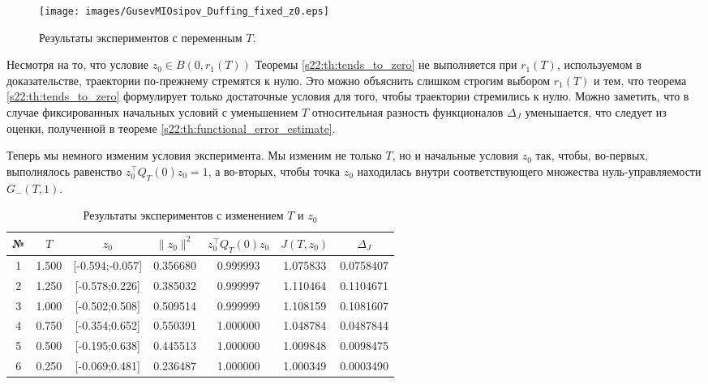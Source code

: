 \documentclass[../main.tex]{subfiles}
\begin{document}
\begin{figure}
 \centering
 \texttt{[image: images/GusevMIOsipov\_Duffing\_fixed\_z0.eps]}
 \caption{Результаты экспериментов с переменным $T$.}
 \label{s22:fig:series1}
\end{figure}

Несмотря на то, что условие $z_0 \in B(0,r_1(T))$ Теоремы \ref{s22:th:tends_to_zero} не выполняется при $r_1(T)$, используемом в доказательстве, траектории по-прежнему стремятся к нулю. 
Это можно объяснить слишком строгим выбором $r_1(T)$ и тем, что теорема \ref{s22:th:tends_to_zero} формулирует только достаточные условия для того, чтобы траектории стремились к нулю. 
Можно заметить, что в случае фиксированных начальных условий с уменьшением $T$ относительная разность функционалов $\Delta_J$ уменьшается, что следует из оценки, полученной в теореме \ref{s22:th:functional_error_estimate}.

Теперь мы немного изменим условия эксперимента. 
Мы изменим не только $T$, но и начальные условия $z_0$ так, чтобы, во-первых, выполнялось равенство 
$z_0^{\top} Q_T(0) z_0 = 1$, а во-вторых, чтобы точка $z_0$ находилась внутри 
соответствующего множества нуль-управляемости $G_{-}(T,1)$.


\begin{table}
\caption{Результаты экспериментов с изменением $T$ и $z_0$}
\label{s22:ExampleTable2}
\begin{center}
\begin{tabular}{c|c|c|c|c|c|c}
 № & $T$ & $z_0$ & $\|z_0\|^2$&$z_0^{\top} Q_T(0) z_0$ &$J(T,z_0)$&$\Delta_J$ \\ \hline 
 1 & 1.500 & [-0.594;-0.057] & 0.356680 & 0.999993 & 1.075833 & 0.0758407 \\ \hline
 2 & 1.250 & [-0.578;0.226] & 0.385032 & 0.999997 & 1.110464 & 0.1104671 \\ \hline
 3 & 1.000 & [-0.502;0.508] & 0.509514 & 0.999999 & 1.108159 & 0.1081607 \\ \hline
 4 & 0.750 & [-0.354;0.652] & 0.550391 & 1.000000 & 1.048784 & 0.0487844 \\ \hline
 5 & 0.500 & [-0.195;0.638] & 0.445513 & 1.000000 & 1.009848 & 0.0098475 \\ \hline
 6 & 0.250 & [-0.069;0.481] & 0.236487 & 1.000000 & 1.000349 & 0.0003490 \\ \hline
\end{tabular}
\end{center}
\end{table} 
\end{document}
